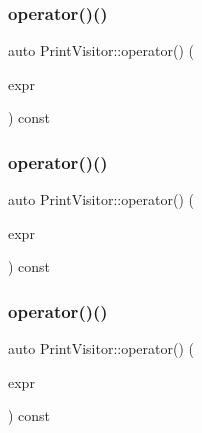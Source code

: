 \mbox{\label{struct_print_visitor_afa73257e022950045f6464ee7b1a1589}} 
\subsubsection{\texorpdfstring{operator()()}{operator()()}\hspace{0.1cm}{\footnotesize\ttfamily [12/38]}}
{\footnotesize\ttfamily auto Print\+Visitor\+::operator() (\begin{DoxyParamCaption}\item[{const \hyperlink{struct_postfix_expression}{Postfix\+Expression} \&}]{expr }\end{DoxyParamCaption}) const\hspace{0.3cm}{\ttfamily [inline]}}

\mbox{\label{struct_print_visitor_ab5ad96b327293300cb19ab25c6b6cb2f}} 
\subsubsection{\texorpdfstring{operator()()}{operator()()}\hspace{0.1cm}{\footnotesize\ttfamily [13/38]}}
{\footnotesize\ttfamily auto Print\+Visitor\+::operator() (\begin{DoxyParamCaption}\item[{const \hyperlink{struct_unary_expression}{Unary\+Expression} \&}]{expr }\end{DoxyParamCaption}) const\hspace{0.3cm}{\ttfamily [inline]}}

\mbox{\label{struct_print_visitor_a2a2691cb80383548dadfa8ac2796eae7}} 
\subsubsection{\texorpdfstring{operator()()}{operator()()}\hspace{0.1cm}{\footnotesize\ttfamily [14/38]}}
{\footnotesize\ttfamily auto Print\+Visitor\+::operator() (\begin{DoxyParamCaption}\item[{const \hyperlink{struct_binary_expression}{Binary\+Expression} \&}]{expr }\end{DoxyParamCaption}) const\hspace{0.3cm}{\ttfamily [inline]}}

